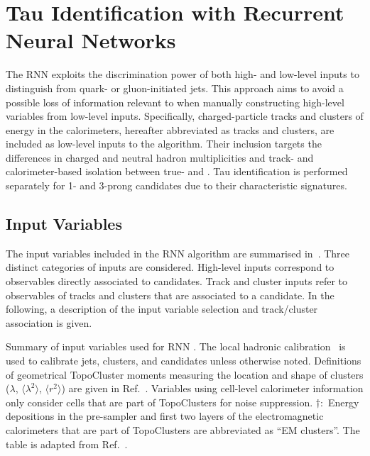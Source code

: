 \section{Tau Identification with Recurrent Neural Networks}%
\label{sec:tauid_rnn}

The RNN \tauid exploits the discrimination power of both high- and
low-level inputs to distinguish \tauhad from quark- or gluon-initiated
jets. This approach aims to avoid a possible loss of information
relevant to \tauid when manually constructing high-level variables
from low-level inputs. Specifically, charged-particle tracks and
clusters of energy in the calorimeters, hereafter abbreviated as
tracks and clusters, are included as low-level inputs to the
algorithm. Their inclusion targets the differences in charged and
neutral hadron multiplicities and track- and calorimeter-based
isolation between true- and \faketauhadvis. Tau identification is
performed separately for 1- and 3-prong \tauhadvis candidates due to
their characteristic signatures.


\subsection{Input Variables}

The input variables included in the RNN \tauid algorithm are
summarised in~. Three distinct
categories of inputs are considered. High-level inputs correspond to
observables directly associated to \tauhadvis candidates. Track and
cluster inputs refer to observables of tracks and clusters that are
associated to a \tauhadvis candidate. In the following, a description
of the input variable selection and track/cluster association is
given.

\begin{table}[htbp]
  \centering

  \caption{Summary of input variables used for RNN \tauid. The local
    hadronic calibration~\cite{PERF-2014-07} is used to calibrate
    jets, clusters, and \tauhadvis candidates unless otherwise
    noted. Definitions of geometrical TopoCluster moments measuring
    the location and shape of clusters ($\lambda$,
    $\langle \lambda^2 \rangle$, $\langle r^2 \rangle$) are given in
    Ref.~\cite{PERF-2014-07}. Variables using cell-level calorimeter
    information only consider cells that are part of TopoClusters for
    noise suppression. $\dagger$:~Energy depositions in the
    pre-sampler and first two layers of the electromagnetic
    calorimeters that are part of TopoClusters are abbreviated as ``EM
    clusters''. The table is adapted from
    Ref.~\cite{ATL-PHYS-PUB-2019-033}.}%
  \label{tab:tauid_input_variables}

  \resizebox{0.99\textwidth}{!}{
    
  }
\end{table}

